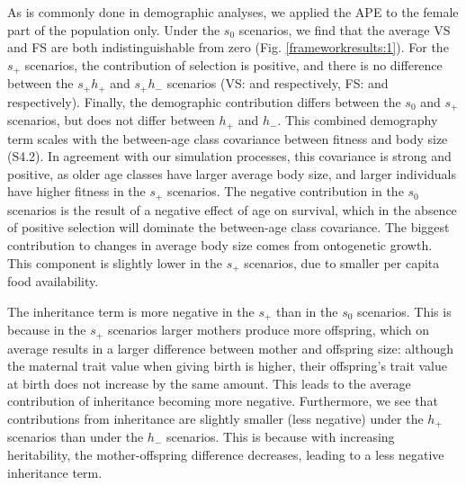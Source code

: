 As is commonly done in demographic analyses, we applied the APE to the female part of the population only. Under the $s_0$ scenarios, we find that the average VS and FS are both indistinguishable from zero (Fig. \ref{frameworkresults:1}). For the $s_+$ scenarios, the contribution of selection is positive, and there is no difference between the $s_+ h_+$ and $s_+h_-$ scenarios (VS:  and  respectively, FS:  and  respectively). Finally, the demographic contribution differs between the $s_0$ and $s_+$ scenarios, but does not differ between $h_+$ and $h_-$. This combined demography term scales with the between-age class covariance between fitness and body size (S4.2). In agreement with our simulation processes, this covariance is strong and positive, as older age classes have larger average body size, and larger individuals have higher fitness in the $s_+$ scenarios. The negative contribution in the $s_0$ scenarios is the result of a negative effect of age on survival, which in the absence of positive selection will dominate the between-age class covariance. The biggest contribution to changes in average body size comes from ontogenetic growth. This component is slightly lower in the $s_+$ scenarios, due to smaller per capita food availability.

The inheritance term is more negative in the $s_+$ than in the $s_0$ scenarios. This is because in the $s_+$ scenarios larger mothers produce more offspring, which on average results in a larger difference between mother and offspring size: although the maternal trait value when giving birth is higher, their offspring's trait value at birth does not increase by the same amount. This leads to the average contribution of inheritance becoming more negative. Furthermore, we see that contributions from inheritance are slightly smaller (less negative) under the $h_+$ scenarios than under the $h_-$ scenarios. This is because with increasing heritability, the mother-offspring difference decreases, leading to a less negative inheritance term.

